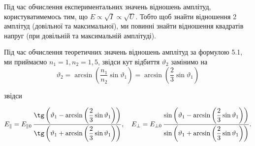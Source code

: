 \documentclass[12pt,a4paper]{article}
\begin{document}
    \begin{landscape}

    Під час обчислення експериментальних значень відношень амплітуд, користуватимемось тим, що $E \propto \sqrt{I} \propto \sqrt{U}$.
    Тобто щоб знайти відношення 2 амплітуд (довільної та максимальної), ми повинні знайти відношення квадратів напруг (при довільній та максимальній амплітуді).

    Під час обчислення теоретичних значень відношень амплітуд за формулою 5.1, ми приймаємо $n_1 = 1, n_2 = 1{,}5$, звідси кут відбиття $\vartheta_2$ замінимо на
    \[
    \vartheta_2 = \arcsin \left(\frac{n_1}{n_2} \sin \vartheta_1\right) = \arcsin \left(\frac{2}{3} \sin \vartheta_1\right)
    \]

    звідси

    \[
    E_{\parallel}
    =E_{\parallel0}\,\frac{\tg\left(\vartheta_1-\arcsin \left(\dfrac{2}{3} \sin \vartheta_1\right)\right)}{\tg\left(\vartheta_1+\arcsin \left(\dfrac{2}{3} \sin \vartheta_1\right)\right)},
    \quad
    E_{\perp}
    =E_{\perp0}\,\frac{\sin\left(\vartheta_1-\arcsin \left(\dfrac{2}{3} \sin \vartheta_1\right)\right)}{\sin\left(\vartheta_1+\arcsin \left(\dfrac{2}{3} \sin \vartheta_1\right)\right)}.
    \]


\end{landscape}
\end{document}
